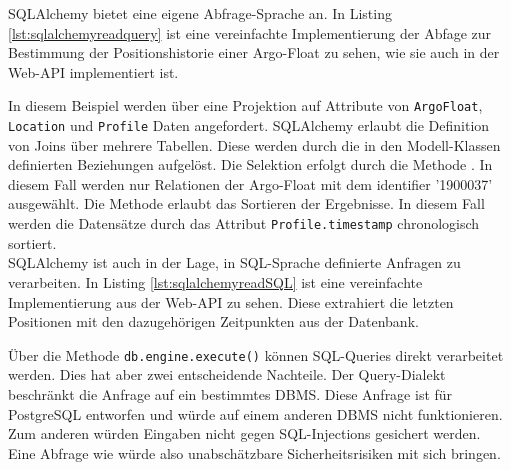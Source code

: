SQLAlchemy bietet eine eigene Abfrage-Sprache an. In Listing \ref{lst:sqlalchemyreadquery} ist eine vereinfachte Implementierung der Abfage zur Bestimmung der Positionshistorie einer Argo-Float zu sehen, wie sie auch in der Web-API implementiert ist.



In diesem Beispiel werden über eine Projektion auf Attribute von \texttt{ArgoFloat}, \texttt{Location} und \texttt{Profile} Daten angefordert. SQLAlchemy erlaubt die Definition von Joins über mehrere Tabellen. Diese werden durch die in den Modell-Klassen definierten Beziehungen aufgelöst. Die Selektion erfolgt durch die Methode . In diesem Fall werden nur Relationen der Argo-Float mit dem identifier '1900037' ausgewählt. Die Methode  erlaubt das Sortieren der Ergebnisse. In diesem Fall werden die Datensätze durch das Attribut \texttt{Profile.timestamp} chronologisch sortiert.
\\

SQLAlchemy ist auch in der Lage, in SQL-Sprache definierte Anfragen zu verarbeiten. In Listing \ref{lst:sqlalchemyreadSQL} ist eine vereinfachte Implementierung aus der Web-API zu sehen. Diese extrahiert die letzten Positionen mit den dazugehörigen Zeitpunkten aus der Datenbank.


Über die Methode \texttt{db.engine.execute()} können SQL-Queries direkt verarbeitet werden. Dies hat aber zwei entscheidende Nachteile. Der Query-Dialekt beschränkt die Anfrage auf ein bestimmtes \gls{DBMS}. Diese Anfrage ist für PostgreSQL entworfen und würde auf einem anderen \gls{DBMS} nicht funktionieren. Zum anderen würden Eingaben nicht gegen SQL-Injections gesichert werden. Eine Abfrage wie
 würde also unabschätzbare Sicherheitsrisiken mit sich bringen.
\\




